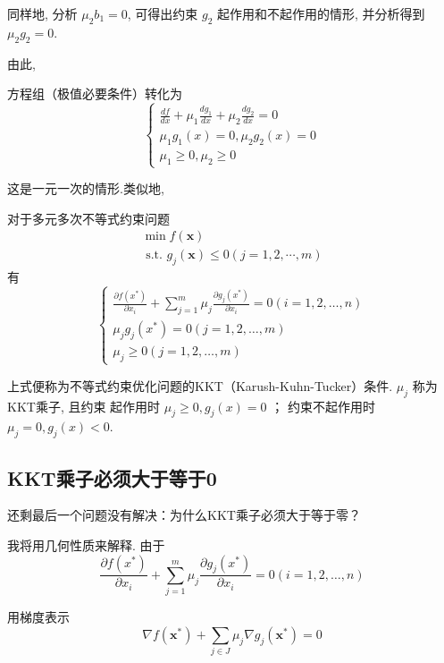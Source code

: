 同样地, 分析 $\mu_{2} b_{1}=0$, 可得出约束 $g_{2}$ 起作用和不起作用的情形, 并分析得到 $\mu_{2} g_{2}=0$.

由此, 
\begin{theorem}[一元一次优化式的KKT条件]
    方程组（极值必要条件）转化为
$$
\left\{\begin{array}{l}
\frac{d f}{d x}+\mu_{1} \frac{d g_{1}}{d x}+\mu_{2} \frac{d g_{2}}{d x}=0 \\
\mu_{1} g_{1}(x)=0, \mu_{2} g_{2}(x)=0 \\
\mu_{1} \geq 0, \mu_{2} \geq 0
\end{array}\right.
$$

\end{theorem}

 这是一元一次的情形.类似地, 

\begin{corollary}
    对于多元多次不等式约束问题
$$
\begin{array}{l}
\min f(\mathbf{x}) \\
\text { s.t. } g_{j}(\mathbf{x}) \leq 0(j=1,2, \cdots, m)
\end{array}
$$
有
$$
\left\{\begin{array}{l}
\frac{\partial f\left(x^{*}\right)}{\partial x_{i}}+\sum_{j=1}^{m} \mu_{j} \frac{\partial g_{j}\left(x^{*}\right)}{\partial x_{i}}=0(i=1,2, \ldots, n) \\
\mu_{j} g_{j}\left(x^{*}\right)=0(j=1,2, \ldots, m) \\
\mu_{j} \geq 0(j=1,2, \ldots, m)
\end{array}\right.
$$

上式便称为不等式约束优化问题的KKT（Karush-Kuhn-Tucker）条件. $ \mu_{j} $ 称为KKT乘子, 且约束 起作用时 $ \mu_{j} \geq 0, g_{j}(x)=0 $ ； 约束不起作用时 $ \mu_{j}=0, g_{j}(x)<0 $.
\end{corollary}

\subsection{KKT乘子必须大于等于0}

\begin{problem}
    还剩最后一个问题没有解决：为什么KKT乘子必须大于等于零？
\end{problem}

我将用几何性质来解释. 由于
$$
\frac{\partial f\left(x^{*}\right)}{\partial x_{i}}+\sum_{j=1}^{m} \mu_{j} \frac{\partial g_{j}\left(x^{*}\right)}{\partial x_{i}}=0(i=1,2, \ldots, n)
$$

用梯度表示 $$ \nabla f\left(\mathbf{x}^{*}\right)+\sum_{j \in J} \mu_{j} \nabla g_{j}\left(\mathbf{x}^{*}\right)=0$$

